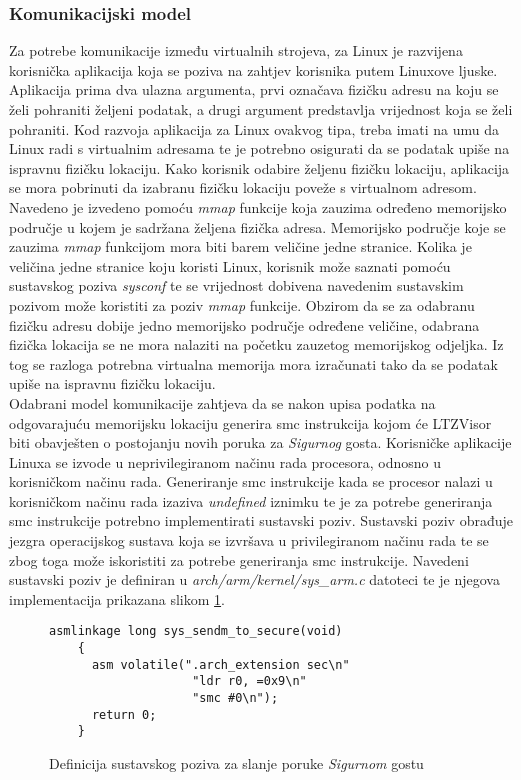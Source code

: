 \documentclass[times, utf8, diplomski, numeric]{fer}
\begin{document}
\subsubsection{Komunikacijski model}
Za potrebe komunikacije između virtualnih strojeva, za Linux je razvijena korisnička aplikacija koja se poziva na zahtjev
korisnika putem Linuxove ljuske. Aplikacija prima dva ulazna argumenta, prvi označava fizičku adresu na koju se želi
pohraniti željeni podatak, a drugi argument predstavlja vrijednost koja se želi pohraniti. Kod razvoja aplikacija za Linux
ovakvog tipa, treba imati na umu da Linux radi s virtualnim adresama te je potrebno osigurati da se podatak upiše na ispravnu
fizičku lokaciju. Kako korisnik odabire željenu fizičku lokaciju, aplikacija se mora pobrinuti da izabranu fizičku lokaciju
poveže s virtualnom adresom. Navedeno je izvedeno pomoću \textit{mmap} funkcije koja zauzima određeno memorijsko područje u
kojem je sadržana željena fizička adresa. Memorijsko područje koje se zauzima \textit{mmap} funkcijom mora biti barem
veličine jedne stranice. Kolika je veličina jedne stranice koju koristi Linux, korisnik može saznati pomoću sustavskog
poziva \textit{sysconf} te se vrijednost dobivena navedenim sustavskim pozivom može koristiti za poziv \textit{mmap}
funkcije. Obzirom da se za odabranu fizičku adresu dobije jedno memorijsko područje određene veličine, odabrana fizička
lokacija se ne mora nalaziti na početku zauzetog memorijskog odjeljka. Iz tog se razloga potrebna virtualna memorija mora
izračunati tako da se podatak upiše na ispravnu fizičku lokaciju.\\
Odabrani model komunikacije zahtjeva da se nakon upisa podatka na odgovarajuću memorijsku lokaciju generira \gls{smc} instrukcija
kojom će LTZVisor biti obavješten o postojanju novih poruka za \textit{Sigurnog} gosta. Korisničke aplikacije Linuxa
se izvode u neprivilegiranom načinu rada procesora, odnosno u korisničkom načinu rada. Generiranje \gls{smc} instrukcije kada
se procesor nalazi u korisničkom načinu rada izaziva \textit{undefined} iznimku te je za potrebe generiranja \gls{smc}
instrukcije potrebno implementirati sustavski poziv. Sustavski poziv obrađuje jezgra operacijskog sustava koja se izvršava
u privilegiranom načinu rada te se zbog toga može iskoristiti za potrebe generiranja \gls{smc} instrukcije. Navedeni sustavski
poziv je definiran u \textit{arch/arm/kernel/sys\_arm.c} datoteci te je njegova implementacija prikazana slikom \ref{sendm}.

\begin{figure}[H]
  \lstset{numbers=left, numbersep=2pt, numberstyle=\tiny, breaklines=true, xleftmargin=.1\textwidth}
  \begin{lstlisting}[showstringspaces=false]
    asmlinkage long sys_sendm_to_secure(void)
    {
      asm volatile(".arch_extension sec\n"
                    "ldr r0, =0x9\n"
                    "smc #0\n");
      return 0;
    }
  \end{lstlisting}
  \caption{Definicija sustavskog poziva za slanje poruke \textit{Sigurnom} gostu}
  \label{sendm}
\end{figure}
\end{document}
